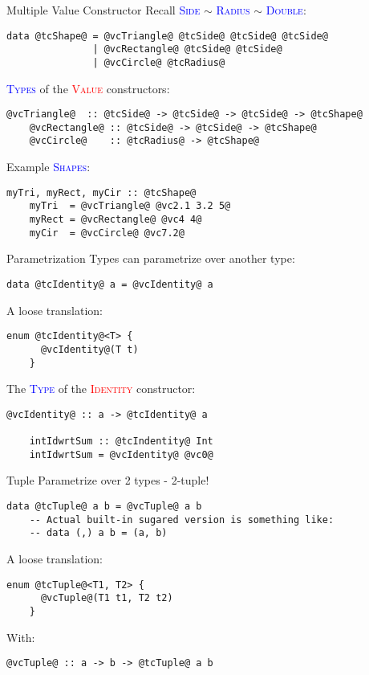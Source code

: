 \documentclass[xcolor={usenames,dvipsnames}]{beamer}
\newcommand{\htycon}[1]{\textcolor{Blue}{\textsc{#1}}}
\newcommand{\hvalcon}[1]{\textcolor{Red}{\textsc{#1}}}
\begin{document}
\begin{frame}[fragile]{Multiple Value Constructor}
  Recall \htycon{Side} $\sim$ \htycon{Radius} $\sim$ \htycon{Double}:
  \begin{lstlisting}[style=hask]
    data @tcShape@ = @vcTriangle@ @tcSide@ @tcSide@ @tcSide@
               | @vcRectangle@ @tcSide@ @tcSide@
               | @vcCircle@ @tcRadius@
  \end{lstlisting}

  \pause
  \htycon{Types} of the \hvalcon{Value} constructors:
  \begin{lstlisting}[style=hask]
    @vcTriangle@  :: @tcSide@ -> @tcSide@ -> @tcSide@ -> @tcShape@
    @vcRectangle@ :: @tcSide@ -> @tcSide@ -> @tcShape@
    @vcCircle@    :: @tcRadius@ -> @tcShape@
  \end{lstlisting}

  \pause
  Example \htycon{Shapes}:
  \begin{lstlisting}[style=hask]
    myTri, myRect, myCir :: @tcShape@
    myTri  = @vcTriangle@ @vc2.1 3.2 5@
    myRect = @vcRectangle@ @vc4 4@
    myCir  = @vcCircle@ @vc7.2@
  \end{lstlisting}
\end{frame}

\begin{frame}[fragile]{Parametrization}
  Types can parametrize over another type:
  \begin{lstlisting}[style=hask]
    data @tcIdentity@ a = @vcIdentity@ a
  \end{lstlisting}

  \pause
  A loose translation:
  \begin{lstlisting}[style=hask]
    enum @tcIdentity@<T> {
      @vcIdentity@(T t)
    }
  \end{lstlisting}

  \pause
  The \htycon{Type} of the \hvalcon{Identity} constructor:
  \begin{lstlisting}[style=hask]
    @vcIdentity@ :: a -> @tcIdentity@ a

    intIdwrtSum :: @tcIndentity@ Int
    intIdwrtSum = @vcIdentity@ @vc0@
  \end{lstlisting}
\end{frame}

\begin{frame}[fragile]{Tuple}
  Parametrize over 2 types - 2-tuple!
  \begin{lstlisting}[style=hask]
    data @tcTuple@ a b = @vcTuple@ a b
    -- Actual built-in sugared version is something like:
    -- data (,) a b = (a, b)
  \end{lstlisting}

  \pause
  A loose translation:
  \begin{lstlisting}[style=hask]
    enum @tcTuple@<T1, T2> {
      @vcTuple@(T1 t1, T2 t2)
    }
  \end{lstlisting}

  \pause
  With:
  \begin{lstlisting}[style=hask]
    @vcTuple@ :: a -> b -> @tcTuple@ a b
  \end{lstlisting}
\end{frame}
\end{document}
